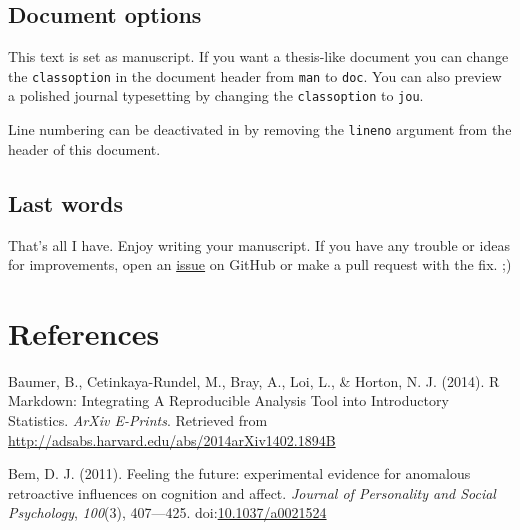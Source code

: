 \documentclass[american,man]{apa6}
\begin{document}
\subsection{Document options}\label{document-options}

This text is set as manuscript. If you want a thesis-like document you
can change the \texttt{classoption} in the document header from
\texttt{man} to \texttt{doc}. You can also preview a polished journal
typesetting by changing the \texttt{classoption} to \texttt{jou}.

Line numbering can be deactivated in by removing the \texttt{lineno}
argument from the header of this document.

\subsection{Last words}\label{last-words}

That's all I have. Enjoy writing your manuscript. If you have any
trouble or ideas for improvements, open an
\href{https://github.com/crsh/r2apa/issues}{issue} on GitHub or make a
pull request with the fix. ;)

\section{References}\label{references}

{Baumer}, B., {Cetinkaya-Rundel}, M., {Bray}, A., {Loi}, L., \&
{Horton}, N. J. (2014). R Markdown: Integrating A Reproducible Analysis
Tool into Introductory Statistics. \emph{ArXiv E-Prints}. Retrieved from
\url{http://adsabs.harvard.edu/abs/2014arXiv1402.1894B}

Bem, D. J. (2011). Feeling the future: experimental evidence for
anomalous retroactive influences on cognition and affect. \emph{Journal
of Personality and Social Psychology}, \emph{100}(3), 407---425.
doi:\href{http://dx.doi.org/10.1037/a0021524}{10.1037/a0021524}
\end{document}
